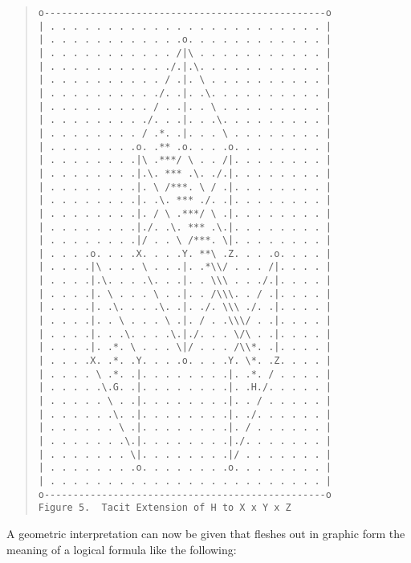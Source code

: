 \documentclass[12pt]{article}
\begin{document}
\begin{quote}\begin{verbatim}
o-------------------------------------------------o
| . . . . . . . . . . . . . . . . . . . . . . . . |
| . . . . . . . . . . . .o. . . . . . . . . . . . |
| . . . . . . . . . . . /|\ . . . . . . . . . . . |
| . . . . . . . . . . ./.|.\. . . . . . . . . . . |
| . . . . . . . . . . / .|. \ . . . . . . . . . . |
| . . . . . . . . . ./. .|. .\. . . . . . . . . . |
| . . . . . . . . . / . .|. . \ . . . . . . . . . |
| . . . . . . . . ./. . .|. . .\. . . . . . . . . |
| . . . . . . . . / .*. .|. . . \ . . . . . . . . |
| . . . . . . . .o. .** .o. . . .o. . . . . . . . |
| . . . . . . . .|\ .***/ \ . . /|. . . . . . . . |
| . . . . . . . .|.\. *** .\. ./.|. . . . . . . . |
| . . . . . . . .|. \ /***. \ / .|. . . . . . . . |
| . . . . . . . .|. .\. *** ./. .|. . . . . . . . |
| . . . . . . . .|. / \ .***/ \ .|. . . . . . . . |
| . . . . . . . .|./. .\. *** .\.|. . . . . . . . |
| . . . . . . . .|/ . . \ /***. \|. . . . . . . . |
| . . . .o. . . .X. . . .Y. **\ .Z. . . .o. . . . |
| . . . .|\ . . . \ . . .|. .*\\/ . . . /|. . . . |
| . . . .|.\. . . .\. . .|. . \\\ . . ./.|. . . . |
| . . . .|. \ . . . \ . .|. . /\\\. . / .|. . . . |
| . . . .|. .\. . . .\. .|. ./. \\\ ./. .|. . . . |
| . . . .|. . \ . . . \ .|. / . .\\\/ . .|. . . . |
| . . . .|. . .\. . . .\.|./. . . \/\ . .|. . . . |
| . . . .|. .*. \ . . . \|/ . . . /\\*. .|. . . . |
| . . . .X. .*. .Y. . . .o. . . .Y. \*. .Z. . . . |
| . . . . \ .*. .|. . . . . . . .|. .*. / . . . . |
| . . . . .\.G. .|. . . . . . . .|. .H./. . . . . |
| . . . . . \ . .|. . . . . . . .|. . / . . . . . |
| . . . . . .\. .|. . . . . . . .|. ./. . . . . . |
| . . . . . . \ .|. . . . . . . .|. / . . . . . . |
| . . . . . . .\.|. . . . . . . .|./. . . . . . . |
| . . . . . . . \|. . . . . . . .|/ . . . . . . . |
| . . . . . . . .o. . . . . . . .o. . . . . . . . |
| . . . . . . . . . . . . . . . . . . . . . . . . |
o-------------------------------------------------o
Figure 5.  Tacit Extension of H to X x Y x Z
\end{verbatim}\end{quote}

A geometric interpretation can now be given that fleshes out in graphic form the meaning of a logical formula like the following:
\end{document}
